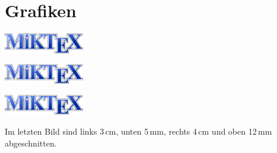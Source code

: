 \documentclass{scrartcl}
\begin{document}
  \section{Grafiken}

  \includegraphics[width=3.5cm]{miktex}

  \includegraphics[width=3.5cm,angle=20]{miktex}

  \includegraphics[width=3.5cm,trim=3cm 5mm 4cm 12mm,clip=true]{miktex}

  Im letzten Bild sind links 3\,cm, unten 5\,mm, rechts 4\,cm und oben 12\,mm abgeschnitten.
\end{document}
